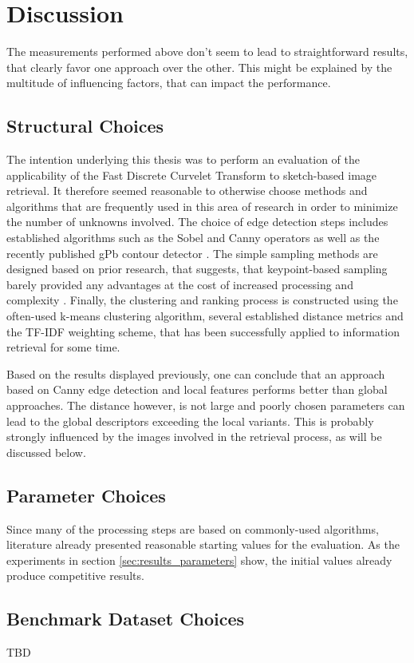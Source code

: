 \chapter{Discussion}\label{ch:discussion}

The measurements performed above don't seem to lead to straightforward results,
that clearly favor one approach over the other. This might be explained by the
multitude of influencing factors, that can impact the performance.

\section{Structural Choices}

The intention underlying this thesis was to perform an evaluation of the
applicability of the Fast Discrete Curvelet Transform to sketch-based image
retrieval. It therefore seemed reasonable to otherwise choose methods and
algorithms that are frequently used in this area of research in order to
minimize the number of unknowns involved. The choice of edge detection steps
includes established algorithms such as the Sobel and Canny operators as well
as the recently published gPb contour detector
\autocite{arbelaez_contour_2011}. The simple sampling methods are designed
based on prior research, that suggests, that keypoint-based sampling barely
provided any advantages at the cost of increased processing and complexity
\autocite{nowak_sampling_2006}. Finally, the clustering and ranking process is
constructed using the often-used k-means clustering algorithm, several
established distance metrics and the TF-IDF weighting scheme, that has been
successfully applied to information retrieval for some time.

Based on the results displayed previously, one can conclude that an approach
based on Canny edge detection and local features performs better than global
approaches. The distance however, is not large and poorly chosen parameters can
lead to the global descriptors exceeding the local variants. This is probably
strongly influenced by the images involved in the retrieval process, as will be
discussed below.

\section{Parameter Choices}

Since many of the processing steps are based on commonly-used algorithms,
literature already presented reasonable starting values for the evaluation. As
the experiments in section \ref{sec:results_parameters} show, the initial
values already produce competitive results.

\section{Benchmark Dataset Choices}

TBD
